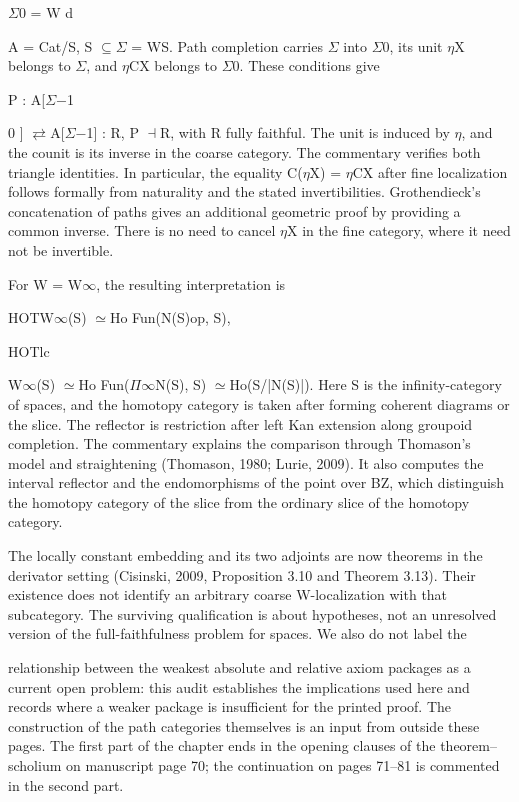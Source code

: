 \ensuremath{\Sigma}0 = W d


A = Cat/S, S \ensuremath{\subseteq}\ensuremath{\Sigma} = WS. Path completion carries \ensuremath{\Sigma} into \ensuremath{\Sigma}0, its unit \ensuremath{\eta}X belongs to \ensuremath{\Sigma}, and \ensuremath{\eta}CX belongs to \ensuremath{\Sigma}0. These conditions give


P : A[\ensuremath{\Sigma}\ensuremath{-}1


0 ] \ensuremath{\rightleftarrows}A[\ensuremath{\Sigma}\ensuremath{-}1] : R, P \ensuremath{\dashv}R, with R fully faithful. The unit is induced by \ensuremath{\eta}, and the counit is its inverse in the coarse category. The commentary verifies both triangle identities. In particular, the equality C(\ensuremath{\eta}X) = \ensuremath{\eta}CX after fine localization follows formally from naturality and the stated invertibilities. Grothendieck’s concatenation of paths gives an additional geometric proof by providing a common inverse. There is no need to cancel \ensuremath{\eta}X in the fine category, where it need not be invertible.


For W = W\ensuremath{\infty}, the resulting interpretation is


HOTW\ensuremath{\infty}(S) \ensuremath{\simeq}Ho Fun(N(S)op, S),


HOTlc


W\ensuremath{\infty}(S) \ensuremath{\simeq}Ho Fun(\ensuremath{\Pi}\ensuremath{\infty}N(S), S) \ensuremath{\simeq}Ho(S/|N(S)|). Here S is the infinity-category of spaces, and the homotopy category is taken after forming coherent diagrams or the slice. The reflector is restriction after left Kan extension along groupoid completion. The commentary explains the comparison through Thomason’s model and straightening (Thomason, 1980; Lurie, 2009). It also computes the interval reflector and the endomorphisms of the point over BZ, which distinguish the homotopy category of the slice from the ordinary slice of the homotopy category.


The locally constant embedding and its two adjoints are now theorems in the derivator setting (Cisinski, 2009, Proposition 3.10 and Theorem 3.13). Their existence does not identify an arbitrary coarse W-localization with that subcategory. The surviving qualification is about hypotheses, not an unresolved version of the full-faithfulness problem for spaces. We also do not label the


relationship between the weakest absolute and relative axiom packages as a current open problem: this audit establishes the implications used here and records where a weaker package is insufficient for the printed proof. The construction of the path categories themselves is an input from outside these pages. The first part of the chapter ends in the opening clauses of the theorem--scholium on manuscript page 70; the continuation on pages 71--81 is commented in the second part.

\nocite{*}
